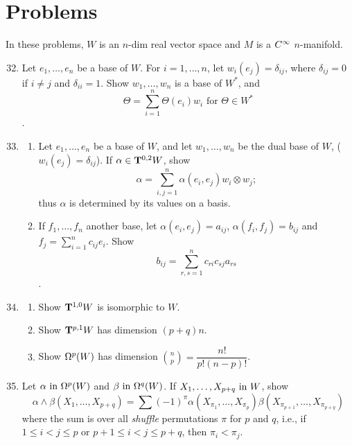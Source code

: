 \documentclass[../main]{subfiles}
\begin{document}
\section*{Problems}
In these problems, $W$ is an $n$-dim real vector space and $M$ is a $\CInfty$ $n$-manifold.

\begin{enumerate}
    \setcounter{enumi}{31}
    \item\label{pro:32} Let $e_1,\dots,e_n$ be a base of $W$. For $i= 1,\dots,n$, let $w_i(e_j) = \delta_{ij}$, where $\delta_{ij} = 0$ if $i\ne j$ and $\delta_{ii} = 1$. Show $w_1,\dots,w_n$ is a base of $W^\ast$, and  \[\Theta = \sum_{i=1}^n \Theta(e_i)w_i\text{ for } \Theta \in W^\ast\]. 
    
    \item\label{pro:33} 
    \begin{enumerate}[label=(\roman*)]
        \item Let $e_1,\dots,e_n$ be a base of $W$, and let $w_1,\dots,w_n$ be the dual base of $W$, ($w_i(e_j) = \delta_{ij}$). If $\alpha \in \tensorbundle{W}{0}{2}$, show \[\alpha = \sum_{i,j=1}^n \alpha(e_i, e_j)w_i \otimes w_j;\] thus $\alpha$ is determined by its values on a basis.
        \item If $f_1,\dots,f_n$ another base, let $\alpha(e_i,e_j) = a_{ij}$, $\alpha(f_i, f_j) = b_{ij}$ and \newline $f_j = \displaystyle\sum_{i=1}^n c_{ij}e_i$. Show \[b_{ij} = \sum_{r,s=1}^n c_{ri} c_{sj}a_{rs}\].
    \end{enumerate}
      
    
    \item\label{pro:34} 
    \begin{enumerate}[label=(\roman*)]
        \item Show $\tensorbundle{W}{1}{0}$ is isomorphic to $W$.
        \item Show $\tensorbundle{W}{p}{1}$ has dimension $(p+q)n$.
        \item Show $\formbundle{W}{p}$ has dimension $\displaystyle\binom{n}{p} = \dfrac{n!}{p!(n-p)!}$.
    \end{enumerate}
      
    
    \item\label{pro:35} Let $\alpha \InText \formbundle{W}{p}$ and $\beta \InText \formbundle{W}{q}$. If $X_1,\dots,X_{p+q} \InText W$, show
    \[ \alpha\wedge\beta(X_1,\dots,X_{p+q}) = \sum(-1)^\pi\alpha(X_{\pi_1},\dots,X_{\pi_p})\beta(X_{\pi_{p+1}},\dots,X_{\pi_{p+q}})\]
    where the sum is over all \emph{shuffle} permutations $\pi$ for $p$ and $q$, i.e., if\newline $1\le i<j\le p$ or $p+1\le i < j \le p+q$, then $\pi_i < \pi_j$. 
    

\end{enumerate}
\end{document}
